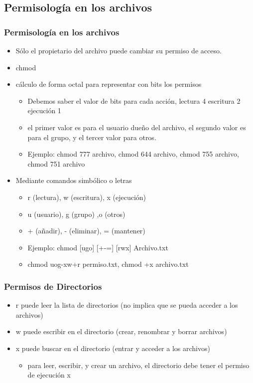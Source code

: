\documentclass{beamer}
\begin{document}
\subsection{Permisolog\'ia en los archivos}
\begin{frame}
\frametitle{Permisolog\'ia en los archivos}
        \begin{itemize}
        \item S\'olo el propietario del archivo puede cambiar su permiso de acceso.
        \item chmod
        \item c\'alculo de forma octal para representar con bits los permisos
                \begin{itemize}
                        \item Debemos saber el valor de bits para cada acci\'on, lectura 4 escritura 2 ejecuci\'on 1
                        \item el primer valor es para el usuario due\~no del archivo, el segundo valor es para el grupo, y el tercer valor para otros.
                        \item \alert {Ejemplo: } chmod 777 archivo, chmod 644 archivo, chmod 755 archivo, chmod 751 archivo
                \end{itemize}
        \end{itemize}
\end{frame}

\begin{frame}
\begin{itemize}
\frametitle{Permisolog\'ia en los archivos}
\item Mediante comandos simb\'olico o  letras
\begin{itemize}
\item r (lectura), w (escritura), x (ejecuci\'on)
\item u (usuario), g (grupo) ,o (otros)
\item + (a\~nadir),  - (eliminar),  = (mantener)
\item \alert{Ejemplo:} chmod [ugo] [+-=] [rwx] Archivo.txt
\item chmod uog-xw+r permiso.txt, chmod +x archivo.txt
\end{itemize}
\end{itemize}
\end{frame}

\begin{frame}
\frametitle{Permisos de Directorios}
\begin{itemize}
\item r puede leer la lista de directorios (no implica que se pueda acceder a los archivos)
\item w puede escribir en el directorio (crear, renombrar y borrar archivos)
\item x puede buscar en el directorio (entrar y acceder a los archivos)
        \begin{itemize}
        \item para leer, escribir, y crear un archivo, el directorio debe tener el permiso de ejecuci\'on x
        \end{itemize}
\end{itemize}
\end{frame}
\end{document}

